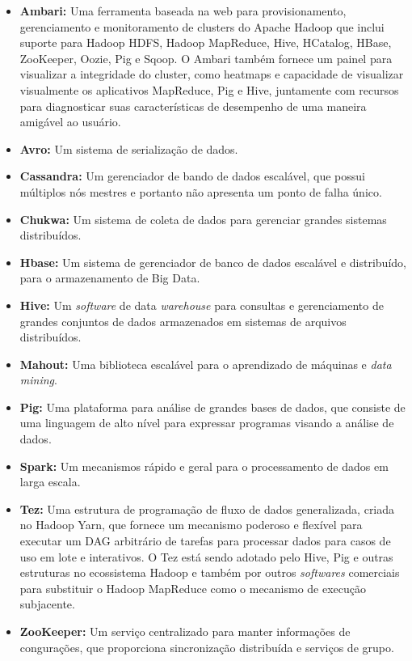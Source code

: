 \begin{itemize}
\item \textbf{Ambari:} Uma ferramenta baseada na web para provisionamento, gerenciamento e monitoramento de clusters do Apache Hadoop que inclui suporte para Hadoop HDFS, Hadoop MapReduce, Hive, HCatalog, HBase, ZooKeeper, Oozie, Pig e Sqoop. O Ambari também fornece um painel para visualizar a integridade do cluster, como heatmaps e capacidade de visualizar visualmente os aplicativos MapReduce, Pig e Hive, juntamente com recursos para diagnosticar suas características de desempenho de uma maneira amigável ao usuário.

\item \textbf{Avro:} Um sistema de serialização de dados.

\item \textbf{Cassandra:} Um gerenciador de bando de dados escalável, que possui múltiplos nós mestres e portanto não apresenta um ponto de falha único.

\item \textbf{Chukwa:} Um sistema de coleta de dados para gerenciar grandes sistemas distribuídos.

\item \textbf{Hbase:} Um sistema de gerenciador de banco de dados escalável e distribuído, para o armazenamento de Big Data.

\item \textbf{Hive:} Um \textit{software} de data \textit{warehouse} para consultas e gerenciamento de grandes conjuntos de dados armazenados em sistemas de arquivos distribuídos.

\item \textbf{Mahout:} Uma biblioteca escalável para o aprendizado de máquinas e \textit{data mining}.

\item \textbf{Pig:} Uma plataforma para análise de grandes bases de dados, que consiste de uma linguagem de alto nível para expressar programas visando a análise de dados.

\item \textbf{Spark:} Um mecanismos rápido e geral para o processamento de dados em larga escala.

\item \textbf{Tez:} Uma estrutura de programação de fluxo de dados generalizada, criada no Hadoop Yarn, que fornece um mecanismo poderoso e flexível para executar um DAG arbitrário de tarefas para processar dados para casos de uso em lote e interativos. O Tez está sendo adotado pelo Hive, Pig e outras estruturas no ecossistema Hadoop e também por outros \textit{softwares} comerciais para substituir o Hadoop MapReduce como o mecanismo de execução subjacente.



\item \textbf{ZooKeeper:} Um serviço centralizado para manter informações de congurações, que proporciona sincronização distribuída e serviços de grupo.
\end{itemize}

